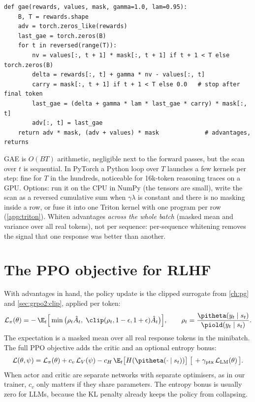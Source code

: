 \begin{lstlisting}[caption={GAE over right-padded responses (\ident{llmsys/rlhf/losses.py}).},label={lst:rlhf:gae}]
def gae(rewards, values, mask, gamma=1.0, lam=0.95):
    B, T = rewards.shape
    adv = torch.zeros_like(rewards)
    last_gae = torch.zeros(B)
    for t in reversed(range(T)):
        nv = values[:, t + 1] * mask[:, t + 1] if t + 1 < T else torch.zeros(B)
        delta = rewards[:, t] + gamma * nv - values[:, t]
        carry = mask[:, t + 1] if t + 1 < T else 0.0   # stop after final token
        last_gae = (delta + gamma * lam * last_gae * carry) * mask[:, t]
        adv[:, t] = last_gae
    return adv * mask, (adv + values) * mask             # advantages, returns
\end{lstlisting}

\begin{systemslens}
GAE is $O(BT)$ arithmetic, negligible next to the forward passes, but the scan over $t$ is
sequential. In PyTorch a Python loop over $T$ launches a few kernels per step: fine for $T$ in the
hundreds, noticeable for 16k-token reasoning traces on a GPU. Options: run it on the CPU in NumPy (the
tensors are small), write the scan as a reversed cumulative sum when $\gamma\lambda$ is constant and
there is no masking inside a row, or fuse it into one Triton kernel with one program per row
(\cref{app:triton}). Whiten advantages \emph{across the whole batch} (masked mean and variance over
all real tokens), not per sequence: per-sequence whitening removes the signal that one response was
better than another.
\end{systemslens}

\section{The PPO objective for RLHF}\label{sec:rlhf:ppo}

With advantages in hand, the policy update is the clipped surrogate from \cref{ch:pg} and
\cref{sec:grpo2:clip}, applied per token:
\begin{equation}
  \mathcal{L}_\pi(\theta) = -\,\E_t\Big[\min\big(\rho_t\hat A_t,\;
     \clip(\rho_t, 1-\epsilon, 1+\epsilon)\hat A_t\big)\Big],
  \qquad \rho_t = \frac{\pitheta(y_t\mid s_t)}{\piold(y_t\mid s_t)}.
  \label{eq:rlhf:clip}
\end{equation}
The expectation is a masked mean over all real response tokens in the minibatch. The full PPO
objective adds the critic and an optional entropy bonus:
\begin{equation}
  \mathcal{L}(\theta,\psi) = \mathcal{L}_\pi(\theta) + c_v\,\mathcal{L}_V(\psi) - c_H\,\E_t\big[H(\pitheta(\cdot\mid s_t))\big]
  \;\big[\, + \gamma_{\text{ptx}}\,\mathcal{L}_{\text{LM}}(\theta)\,\big].
  \label{eq:rlhf:total}
\end{equation}
When actor and critic are separate networks with separate optimisers, as in our trainer, $c_v$
only matters if they share parameters. The entropy bonus is usually zero for LLMs, because the KL
penalty already keeps the policy from collapsing.

